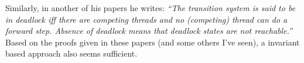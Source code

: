 \documentclass{article}
\theoremstyle{definition}
\begin{document}
Similarly, in another of his papers \cite{hesselinkCorrectnessConcurrentComplexity2016} he writes:
\emph{``The transition system is said to be in deadlock iff there are competing threads and no (competing) thread can do a forward step. Absence of deadlock means that deadlock states are not reachable.''}
Based on the proofs given in these papers (and some others I've seen), a invariant based approach also seems sufficient.





\end{document}
